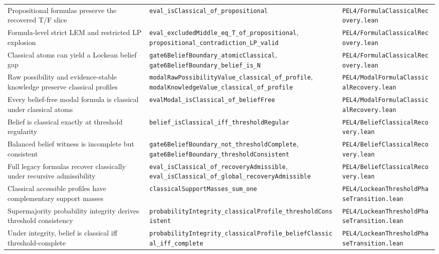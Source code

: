 \begin{longtable}{@{}p{}p{}p{}@{}}
\addlinespace
Propositional formulas preserve the recovered T/F slice & \texttt{eval\_isClassical\_of\_propositional} & \texttt{PEL4/FormulaClassicalRecovery.lean}\\
\addlinespace
Formula-level strict LEM and restricted LP explosion & \texttt{eval\_excludedMiddle\_eq\_T\_of\_propositional}, \texttt{propositional\_contradiction\_LP\_valid} & \texttt{PEL4/FormulaClassicalRecovery.lean}\\
\addlinespace
Classical atoms can yield a Lockean belief gap & \texttt{gate6BeliefBoundary\_atomicClassical}, \texttt{gate6BeliefBoundary\_belief\_is\_N} & \texttt{PEL4/FormulaClassicalRecovery.lean}\\
\addlinespace
Raw possibility and evidence-stable knowledge preserve classical profiles & \texttt{modalRawPossibilityValue\_classical\_of\_profile}, \texttt{modalKnowledgeValue\_classical\_of\_profile} & \texttt{PEL4/ModalFormulaClassicalRecovery.lean}\\
\addlinespace
Every belief-free modal formula is classical under classical atoms & \texttt{evalModal\_isClassical\_of\_beliefFree} & \texttt{PEL4/ModalFormulaClassicalRecovery.lean}\\
\addlinespace
Belief is classical exactly at threshold regularity & \texttt{belief\_isClassical\_iff\_thresholdRegular} & \texttt{PEL4/BeliefClassicalRecovery.lean}\\
\addlinespace
Balanced belief witness is incomplete but consistent & \texttt{gate6BeliefBoundary\_not\_thresholdComplete}, \texttt{gate6BeliefBoundary\_thresholdConsistent} & \texttt{PEL4/BeliefClassicalRecovery.lean}\\
\addlinespace
Full legacy formulas recover classically under recursive admissibility & \texttt{eval\_isClassical\_of\_recoveryAdmissible}, \texttt{eval\_isClassical\_of\_global\_recoveryAdmissible} & \texttt{PEL4/BeliefClassicalRecovery.lean}\\
\addlinespace
Classical accessible profiles have complementary support masses & \texttt{classicalSupportMasses\_sum\_one} & \texttt{PEL4/LockeanThresholdPhaseTransition.lean}\\
\addlinespace
Supermajority probability integrity derives threshold consistency & \texttt{probabilityIntegrity\_classicalProfile\_thresholdConsistent} & \texttt{PEL4/LockeanThresholdPhaseTransition.lean}\\
\addlinespace
Under integrity, belief is classical iff threshold-complete & \texttt{probabilityIntegrity\_classicalProfile\_beliefClassical\_iff\_complete} & \texttt{PEL4/LockeanThresholdPhaseTransition.lean}\\

\end{longtable}
